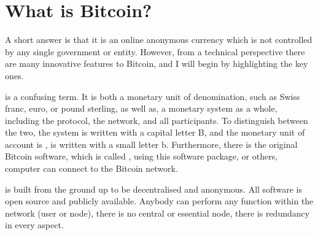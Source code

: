 
\chapter{What is Bitcoin?}

A short answer is that it is an online anonymous currency which is
not controlled by any single government or entity. However, from a
technical perspective there are many innovative features to Bitcoin,
and I will begin by highlighting the key ones. 

is a confusing term. It is both a monetary
unit of denomination, such as Swiss franc, euro, or pound sterling,
as well as, a monetary system as a whole, including the protocol,
the network, and all participants. To distinguish between the two,
the system  is written with a capital letter
B, and the monetary unit of account is ,
is written with a small letter b. Furthermore, there is the original
Bitcoin software, which is called\textbf{ },
using this software package, or others, computer can connect to the
Bitcoin network.

is built from the ground up to be decentralised
and anonymous. All software is open source and publicly available.
Anybody can perform any function within the network (user or node),
there is no central or essential node, there is redundancy in every
aspect.


